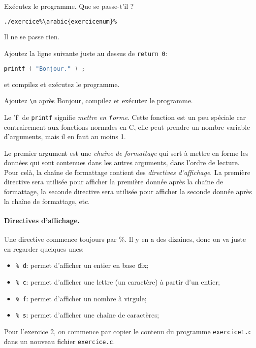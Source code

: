 \question Exécutez le programme. Que se passe-t'il ?
\begin{solution}
  \begin{lstlisting}[language=bash]
    ./exercice%\arabic{exercicenum}%
  \end{lstlisting}
  Il ne se passe rien.
\end{solution}

\question Ajoutez la ligne suivante juste au dessus de \texttt{return 0}:
\begin{lstlisting}[language=C]
  printf ( "Bonjour." ) ;
\end{lstlisting}
et compilez et exécutez le programme.

\begin{center}
\end{center}

\question Ajoutez \verb+\n+ après Bonjour,   compilez et exécutez le programme.

\begin{center}
\end{center}


Le 'f' de \texttt{printf} signifie \emph{mettre en
  \texttt{f}orme}. Cette fonction est un peu spéciale car
contrairement aux fonctions normales en C, elle peut prendre un nombre
variable d'arguments, mais il en faut au moins 1. 

Le premier argument est une \emph{chaîne de formattage} qui sert à
mettre en forme les données qui sont contenues dans les autres
arguments, dans l'ordre de lecture. Pour celà, la chaîne de formattage
contient des \emph{directives d'affichage}. La première directive sera
utilisée pour afficher la première donnée après la chaîne de
formattage, la seconde directive sera utilisée pour afficher la
seconde donnée après la chaîne de formattage, etc.

\paragraph{Directives d'affichage.} Une directive commence toujours
par \%. Il y en a des dizaines, donc on va juste en regarder quelques unes:
\begin{itemize}
\item \texttt{\% d}: permet d'afficher un entier en base \texttt{d}ix;
\item \texttt{\% c}: permet d'afficher une lettre (un caractère) à partir d'un entier;
\item \texttt{\% f}: permet d'afficher un nombre à virgule;
\item \texttt{\% s}: permet d'afficher une chaîne de caractères;
\end{itemize}
Pour l'exercice 2, on commence par copier le contenu du programme
\texttt{exercice1.c} dans un nouveau fichier \texttt{exercice.c}.


